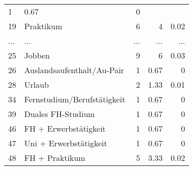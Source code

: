 \begin{longtable}{lXrrr}
          \num{1} &
          \num[round-mode=places,round-precision=2]{0.67} &
          \num[round-mode=places,round-precision=2]{0} \\
        19 & \multicolumn{1}{X}{Praktikum} & %
          \num{6} &
          \num[round-mode=places,round-precision=2]{4} &
          \num[round-mode=places,round-precision=2]{0.02} \\
       ... & ... & ... & ... & ... \\
        25 & \multicolumn{1}{X}{Jobben} & %
          \num{9} &
          \num[round-mode=places,round-precision=2]{6} &
          \num[round-mode=places,round-precision=2]{0.03} \\

        26 & \multicolumn{1}{X}{Auslandsaufenthalt/Au-Pair} & %
          \num{1} &
          \num[round-mode=places,round-precision=2]{0.67} &
          \num[round-mode=places,round-precision=2]{0} \\

        28 & \multicolumn{1}{X}{Urlaub} & %
          \num{2} &
          \num[round-mode=places,round-precision=2]{1.33} &
          \num[round-mode=places,round-precision=2]{0.01} \\

        34 & \multicolumn{1}{X}{Fernstudium/Berufstätigkeit} & %
          \num{1} &
          \num[round-mode=places,round-precision=2]{0.67} &
          \num[round-mode=places,round-precision=2]{0} \\

        39 & \multicolumn{1}{X}{Duales FH-Studium} & %
          \num{1} &
          \num[round-mode=places,round-precision=2]{0.67} &
          \num[round-mode=places,round-precision=2]{0} \\

        46 & \multicolumn{1}{X}{FH + Erwerbstätigkeit} & %
          \num{1} &
          \num[round-mode=places,round-precision=2]{0.67} &
          \num[round-mode=places,round-precision=2]{0} \\

        47 & \multicolumn{1}{X}{Uni + Erwerbstätigkeit} & %
          \num{1} &
          \num[round-mode=places,round-precision=2]{0.67} &
          \num[round-mode=places,round-precision=2]{0} \\

        48 & \multicolumn{1}{X}{FH + Praktikum} & %
          \num{5} &
          \num[round-mode=places,round-precision=2]{3.33} &
          \num[round-mode=places,round-precision=2]{0.02} \\


\end{longtable}
